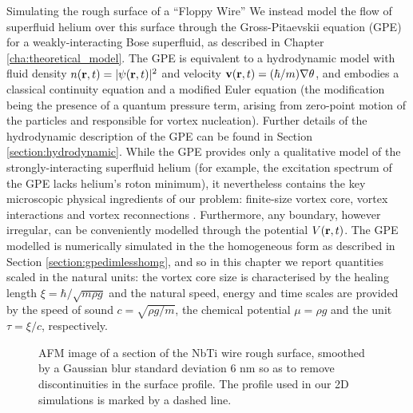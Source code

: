 \begin{chapter}{\label{cha:afm}Simulating the rough surface of a ``Floppy Wire''}
We instead model the flow of superfluid helium over this surface through the Gross-Pitaevskii equation (GPE) \cite{RobertsBerloff} for a weakly-interacting Bose superfluid, as described in Chapter \ref{cha:theoretical_model}. The GPE is equivalent to a hydrodynamic model with fluid density $n({\bf r},t)=|\psi({\bf r},t)|^2$ and velocity ${\bf v}({\bf r},t)=(\hbar/m)\nabla \theta$, and embodies a classical 
continuity equation and a modified Euler equation (the modification being the presence of a quantum pressure term, arising from zero-point motion of the particles {and responsible for vortex nucleation}). Further details of the hydrodynamic description of the GPE can be found in Section \ref{section:hydrodynamic}.
While the GPE provides only a qualitative model of the strongly-interacting superfluid helium (for example, the excitation spectrum of the GPE lacks helium's roton minimum), it nevertheless contains the key microscopic physical ingredients of our problem: finite-size vortex core, vortex interactions and vortex reconnections \cite{RobertsBerloff}.  Furthermore, any boundary, however irregular, can be conveniently modelled through the potential $V({\bf r},t)$. The GPE modelled is numerically simulated in the the homogeneous form as described in Section \ref{section:gpedimlesshomg}, and so in this chapter we report quantities scaled in the natural units: the vortex core size is characterised by the healing length $\xi=\hbar/\sqrt{m \rho g}$ and the natural speed, energy and time scales are provided by the speed of sound $c=\sqrt{\rho g/m}$, the chemical potential $\mu=\rho g$ and the unit $\tau=\xi/c$, respectively. 

\begin{figure}
  \centering
  \caption{\label{fig:afmsmooth}AFM image of a section of the NbTi wire rough surface, smoothed by a Gaussian blur standard deviation 6 nm so as to remove discontinuities in the surface profile. The profile used in our 2D simulations is marked by a dashed line.}
\end{figure}


\end{chapter}
